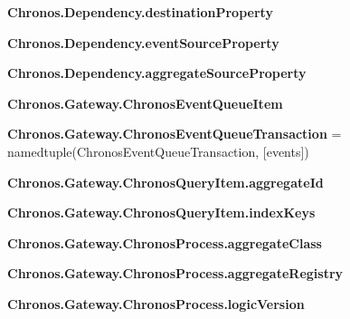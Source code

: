 \begin{DoxyCompactItemize}
\item 
{\bfseries Chronos.\+Dependency.\+destination\+Property}\hypertarget{group__Chronos_gacd8abee85f48d22250e4b0cf31cfdf73}{}\label{group__Chronos_gacd8abee85f48d22250e4b0cf31cfdf73}

\item 
{\bfseries Chronos.\+Dependency.\+event\+Source\+Property}\hypertarget{group__Chronos_ga5533c37e631d1afea80615758ed16643}{}\label{group__Chronos_ga5533c37e631d1afea80615758ed16643}

\item 
{\bfseries Chronos.\+Dependency.\+aggregate\+Source\+Property}\hypertarget{group__Chronos_gac95fdf461dfc289577c53e1acfab5cbd}{}\label{group__Chronos_gac95fdf461dfc289577c53e1acfab5cbd}

\item 
{\bfseries Chronos.\+Gateway.\+Chronos\+Event\+Queue\+Item}
\item 
{\bfseries Chronos.\+Gateway.\+Chronos\+Event\+Queue\+Transaction} = namedtuple(\textquotesingle{}Chronos\+Event\+Queue\+Transaction\textquotesingle{}, \mbox{[}\textquotesingle{}events\textquotesingle{}\mbox{]})\hypertarget{group__Chronos_ga2ce096828e717d411c59903c0559eeff}{}\label{group__Chronos_ga2ce096828e717d411c59903c0559eeff}

\item 
{\bfseries Chronos.\+Gateway.\+Chronos\+Query\+Item.\+aggregate\+Id}\hypertarget{group__Chronos_gadedd702edfb833675da075e3775279cb}{}\label{group__Chronos_gadedd702edfb833675da075e3775279cb}

\item 
{\bfseries Chronos.\+Gateway.\+Chronos\+Query\+Item.\+index\+Keys}\hypertarget{group__Chronos_ga9fa7ad209682c192cafeebdbb91b42da}{}\label{group__Chronos_ga9fa7ad209682c192cafeebdbb91b42da}

\item 
{\bfseries Chronos.\+Gateway.\+Chronos\+Process.\+aggregate\+Class}\hypertarget{group__Chronos_ga9ea5a2e967ab35a8f52d4ba316e13654}{}\label{group__Chronos_ga9ea5a2e967ab35a8f52d4ba316e13654}

\item 
{\bfseries Chronos.\+Gateway.\+Chronos\+Process.\+aggregate\+Registry}\hypertarget{group__Chronos_gaf211b962365073660a47e8daf60e5d47}{}\label{group__Chronos_gaf211b962365073660a47e8daf60e5d47}

\item 
{\bfseries Chronos.\+Gateway.\+Chronos\+Process.\+logic\+Version}\hypertarget{group__Chronos_gadf08503feeff8eb1be1017ca6725fe1f}{}\label{group__Chronos_gadf08503feeff8eb1be1017ca6725fe1f}


\end{DoxyCompactItemize}
